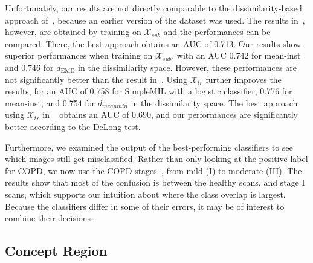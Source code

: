 \documentclass[10pt,conference,a4paper]{IEEEtran}
\begin{document}
Unfortunately, our results are not directly comparable to the dissimilarity-based approach of~\cite{sorensen2010image}, because an earlier version of the dataset was used. The results in~\cite{sorensen2012texture}, however, are obtained by training on $\mathcal{X}_{sub}$ and the performances can be compared. There, the best approach obtains an AUC of 0.713. Our results show superior performances when training on $\mathcal{X}_{sub}$, with an AUC 0.742 for mean-inst and 0.746 for $d_{\text{EMD}}$ in the dissimilarity space. However, these performances are not significantly better than the result in~\cite{sorensen2012texture}. Using $\mathcal{X}_{tr}$ further improves the results, for an AUC of 0.758 for SimpleMIL with a logistic classifier, 0.776 for mean-inst, and 0.754 for $d_{meanmin}$ in the dissimilarity space. The best approach using $\mathcal{X}_{tr}$ in ~\cite{sorensen2012texture} obtains an AUC of 0.690, and our performances are significantly better according to the DeLong test. %


Furthermore, we examined the output of the best-performing classifiers to see which images still get misclassified. Rather than only looking at the positive label for COPD, we now use the COPD stages~\cite{rabe2007global}, from mild (I) to moderate (III). The results show that most of the confusion is between the healthy scans, and stage I scans, which supports our intuition about where the class overlap is largest. Because the classifiers differ in some of their errors, it may be of interest to combine their decisions.





\subsection{Concept Region}
\end{document}
